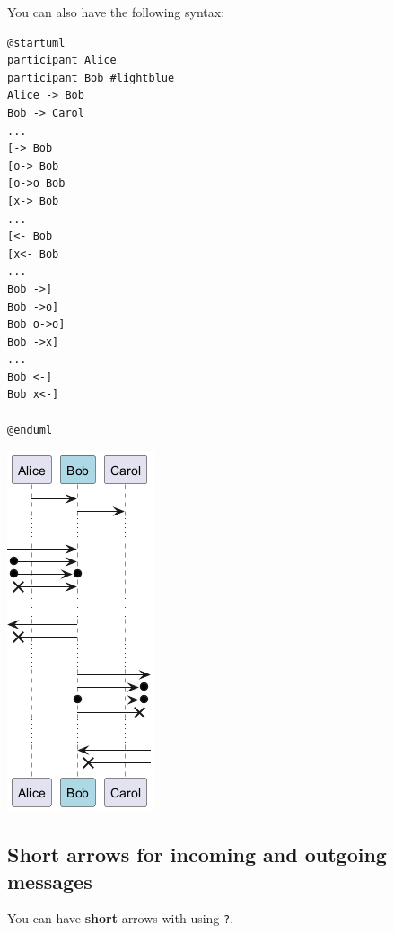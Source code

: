 You can also have the following syntax:
\begin{verbatim}
@startuml
participant Alice
participant Bob #lightblue
Alice -> Bob
Bob -> Carol
...
[-> Bob
[o-> Bob
[o->o Bob
[x-> Bob
...
[<- Bob
[x<- Bob
...
Bob ->]
Bob ->o]
Bob o->o]
Bob ->x]
...
Bob <-]
Bob x<-]

@enduml
\end{verbatim}
\begin{center}
\includegraphics[scale=0.60]{imgw/img-84e349d9dfdb4f5a65542aa3fd68e374.png}
\end{center}
%
%
\subsection{Short arrows for incoming and outgoing messages}


You can have \textbf{short} arrows with using \texttt{?}.


